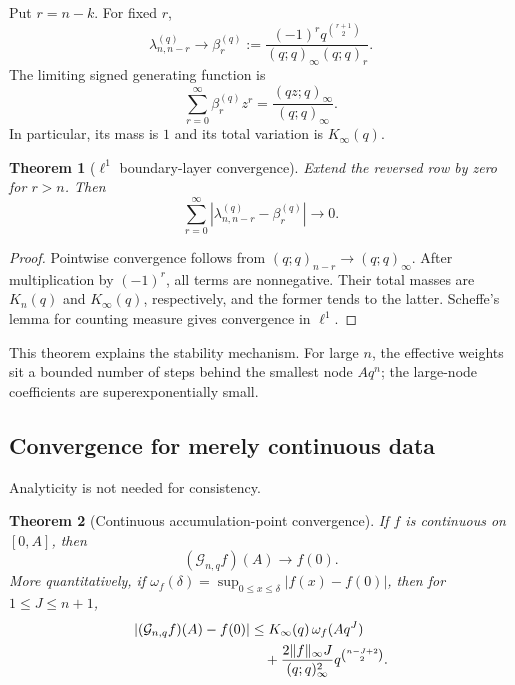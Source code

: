 \documentclass[11pt,oneside]{article}
\numberwithin{equation}{section}
\newtheorem{theorem}{Theorem}[section]
\theoremstyle{definition}
\theoremstyle{remark}
\newcommand{\Gc}{\mathcal G}
\begin{document}
Put $r=n-k$.  For fixed $r$,
\begin{equation}
 \lambda_{n,n-r}^{(q)}\longrightarrow
 \beta_r^{(q)}:=
 \frac{(-1)^rq^{\binom{r+1}{2}}}{(q;q)_\infty(q;q)_r}.
 \label{eq:beta}
\end{equation}
The limiting signed generating function is
\begin{equation}
 \sum_{r=0}^{\infty}\beta_r^{(q)}z^r
 =\frac{(qz;q)_\infty}{(q;q)_\infty}.
 \label{eq:beta-generating}
\end{equation}
In particular, its mass is $1$ and its total variation is $K_\infty(q)$.

\begin{theorem}[$\ell^1$ boundary-layer convergence]
Extend the reversed row by zero for $r>n$.  Then
\begin{equation}
 \sum_{r=0}^{\infty}
 \left|\lambda_{n,n-r}^{(q)}-\beta_r^{(q)}\right|
 \longrightarrow0.
 \label{eq:l1-boundary}
\end{equation}
\end{theorem}

\begin{proof}
Pointwise convergence follows from $(q;q)_{n-r}\to(q;q)_\infty$.  After
multiplication by $(-1)^r$, all terms are nonnegative.  Their total masses are
$K_n(q)$ and $K_\infty(q)$, respectively, and the former tends to the latter.
Scheffe's lemma for counting measure gives convergence in $\ell^1$.
\end{proof}

This theorem explains the stability mechanism.  For large $n$, the effective
weights sit a bounded number of steps behind the smallest node $Aq^n$; the
large-node coefficients are superexponentially small.

\subsection{Convergence for merely continuous data}

Analyticity is not needed for consistency.

\begin{theorem}[Continuous accumulation-point convergence]
If $f$ is continuous on $[0,A]$, then
\begin{equation}
 (\Gc_{n,q}f)(A)\longrightarrow f(0).
 \label{eq:continuous-convergence}
\end{equation}
More quantitatively, if
$\omega_f(\delta)=\sup_{0\le x\le\delta}|f(x)-f(0)|$, then for
$1\le J\le n+1$,
\begin{align}
 |(\Gc_{n,q}f)(A)-f(0)|
 &\le K_\infty(q)\,\omega_f(Aq^J)\notag\\
 &\quad+\frac{2\|f\|_\infty J}{(q;q)_\infty^2}
 q^{\binom{n-J+2}{2}}.
 \label{eq:modulus-bound}
\end{align}
\end{theorem}
\end{document}
